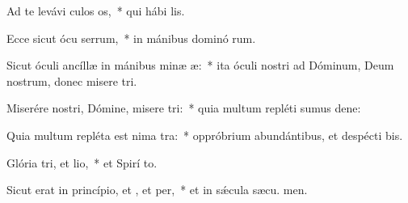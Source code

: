 \item Ad te levávi culos os,~* qui hábi  lis.
\item Ecce sicut ócu serrum,~* in mánibus dominó rum.
\item Sicut óculi ancíllæ in mánibus minæ æ:~* ita óculi nostri ad Dóminum, Deum nostrum, donec misere tri.
\item Miserére nostri, Dómine, misere tri:~* quia multum repléti sumus dene:
\item Quia multum repléta est nima tra:~* oppróbrium abundántibus, et despécti bis.
\item Glória tri, et lio,~* et Spirí to.
\item Sicut erat in princípio, et , et per,~* et in sǽcula sæcu. men.
